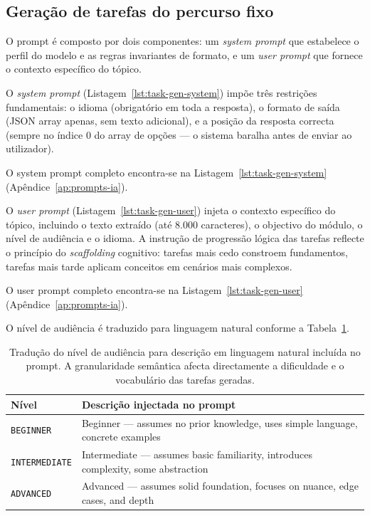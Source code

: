 \subsection{Gera\c{c}\~ao de tarefas do percurso fixo}
\label{ssec:ia-geracao-fixa}

O prompt \'e composto por dois componentes: um \emph{system prompt} que
estabelece o perfil do modelo e as regras invariantes de formato, e um
\emph{user prompt} que fornece o contexto espec\'ifico do t\'opico.

O \emph{system prompt} (Listagem~\ref{lst:task-gen-system}) imp\~oe tr\^es
restri\c{c}\~oes fundamentais: o idioma (obrigat\'orio em toda a resposta),
o formato de sa\'ida (JSON array apenas, sem texto adicional), e a posi\c{c}\~ao
da resposta correcta (sempre no \'indice 0 do array de op\c{c}\~oes --- o
sistema baralha antes de enviar ao utilizador).

O system prompt completo encontra-se na Listagem~\ref{lst:task-gen-system}
(Ap\^endice~\ref{ap:prompts-ia}).

O \emph{user prompt} (Listagem~\ref{lst:task-gen-user}) injeta o contexto
espec\'ifico do t\'opico, incluindo o texto extra\'ido (at\'e 8.000
caracteres), o objectivo do m\'odulo, o n\'ivel de audi\^encia e o idioma.
A instru\c{c}\~ao de progress\~ao l\'ogica das tarefas reflecte o princ\'ipio
do \emph{scaffolding} cognitivo: tarefas mais cedo constroem fundamentos,
tarefas mais tarde aplicam conceitos em cen\'arios mais complexos.

O user prompt completo encontra-se na Listagem~\ref{lst:task-gen-user}
(Ap\^endice~\ref{ap:prompts-ia}).

O n\'ivel de audi\^encia \'e traduzido para linguagem natural conforme a
Tabela~\ref{tab:audience-levels}.

\begin{table}[htbp]
	\centering
	\small
	\begin{tabular}{p{2.8cm} p{9.5cm}}
		\toprule
		\textbf{N\'ivel} & \textbf{Descri\c{c}\~ao injectada no prompt} \\
		\midrule
		\texttt{BEGINNER} &
			Beginner --- assumes no prior knowledge, uses simple language, concrete examples \\
		\texttt{INTERMEDIATE} &
			Intermediate --- assumes basic familiarity, introduces complexity, some abstraction \\
		\texttt{ADVANCED} &
			Advanced --- assumes solid foundation, focuses on nuance, edge cases, and depth \\
		\bottomrule
	\end{tabular}
	\caption[Mapeamento de n\'ivel de audi\^encia para descri\c{c}\~ao no prompt]{Tradu\c{c}\~ao do n\'ivel de audi\^encia para descri\c{c}\~ao em linguagem natural inclu\'ida no prompt. A granularidade sem\^antica afecta directamente a dificuldade e o vocabul\'ario das tarefas geradas.}
	\label{tab:audience-levels}
\end{table}

